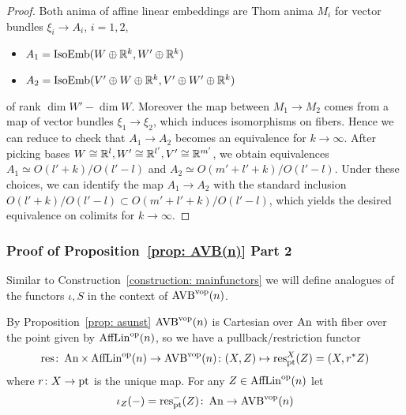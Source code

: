\begin{proof}
    Both anima of affine linear embeddings are Thom anima
    $M_i$ for vector bundles $\xi_i \to A_i$,  $i = 1,2$, 
    \begin{itemize}
      \item $A_1 = \mathrm{IsoEmb}({W \oplus \mathbb{R}^k},{W' \oplus \mathbb{R}^k})$
      \item $A_2 = \mathrm{IsoEmb}({V' \oplus W \oplus \mathbb{R}^k},{V' \oplus W' \oplus \mathbb{R}^k})$
    \end{itemize}
    of rank
    $\dim W' - \dim W$.
    Moreover the map between $M_1 \to M_2$ comes from a map of vector bundles
    $\xi_1 \to \xi_2$, which induces isomorphisms on fibers.
    Hence we can reduce to check that $A_1 \to A_2$ becomes an equivalence for 
    $k \to \infty$.
    After picking bases $W \cong \mathbb{R}^l, W' \cong \mathbb{R}^{l'}, V' \cong \mathbb{R}^{m'}$,
    we obtain equivalences $A_1 \simeq O(l' + k)/O(l' - l)$ and
    $A_2 \simeq O(m' + l' + k)/O(l' - l)$.
    Under these choices, 
    we can identify the map $A_1 \to A_2$ with the standard inclusion
    $O(l' + k)/O(l' - l) \subset O(m' + l' + k)/O(l' - l)$,
    which yields the desired equivalence on colimits for $k \to \infty$.
  \end{proof}

\subsubsection{Proof of Proposition~\ref{prop: AVB(n)} Part 2}

Similar to Construction~\ref{construction: mainfunctors} we will define analogues 
of the functors $\iota, S$ in the context of $\operatorname{AVB}^{\mathrm{vop}}(n)$.

\begin{construction}
    By Proposition~\ref{prop: asunst} $\operatorname{AVB}^{\mathrm{vop}}(n)$ is Cartesian over $\operatorname{An}$ 
    with fiber over the point given by $\operatorname{AffLin}^{\mathrm{op}}(n)$, so we have a pullback/restriction functor
    \[
        \operatorname{res} \colon \operatorname{An} \times \operatorname{AffLin}^{\mathrm{op}}(n) \to \operatorname{AVB}^{\mathrm{vop}}(n) \colon (X, Z) \mapsto \operatorname{res}^X_{\mathrm{pt}}(Z) = (X, r^*Z)
    \]
    where $r \colon X \to \mathrm{pt}$ is the unique map.
    For any $Z \in \operatorname{AffLin}^{\mathrm{op}}(n)$ let 
    \[
        \iota_Z(-) = \operatorname{res}^{-}_{\mathrm{pt}}(Z) \colon \operatorname{An} \to \operatorname{AVB}^{\mathrm{vop}}(n)    
    \]
\end{construction}

